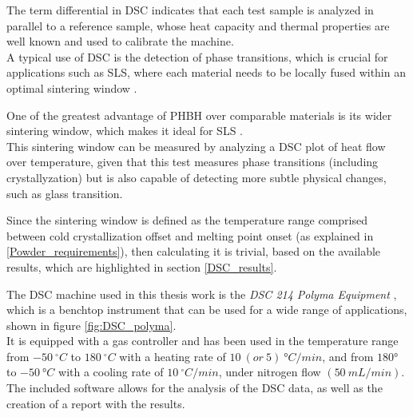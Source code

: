 \documentclass{article}
\begin{document}
            
            The term differential in DSC indicates that each test sample is analyzed in parallel to a reference sample, whose heat capacity and 
            thermal properties are well known and used to calibrate the machine. \\
            
            A typical use of DSC is the detection of phase transitions, which is crucial for applications such as SLS, where each material 
            needs to be locally fused within an optimal sintering window \autocites{Padovano_SLS_Review,SLS_3dprinting_biomedical_polymers}. 
    
            One of the greatest advantage of PHBH over comparable materials is its wider sintering window, which makes it ideal 
            for SLS \autocites{Kovalcik_PHA_Review,Eraslan_PHBH_review}. \\ 
    
            This sintering window can be measured by analyzing a DSC plot of heat flow over temperature, given that this test measures 
            phase transitions (including crystallyzation) but is also capable of detecting more subtle physical changes, such as glass transition. 
    
            Since the sintering window is defined as the temperature range comprised between cold crystallization offset and 
            melting point onset (as explained in \ref{Powder_requirements}), then calculating it is trivial, 
            based on the available results, which are highlighted in section \ref{DSC_results}.

                The DSC machine used in this thesis work is the \textit{DSC 214 Polyma Equipment} \autocites{Netzsch}, which is a benchtop instrument that can be used for 
                a wide range of applications, shown in figure \ref{fig:DSC_polyma}. \\ 

                It is equipped with a gas controller and has been used in the temperature range from $-50 \ ^{\circ} C$ 
                to $180 \ ^{\circ} C$ with 
                a heating rate of $10 \ (or \ 5) \ °C/min$, and from $180°$ to $-50 \ °C$ with a cooling rate of $10  \ ^{\circ}C/min$, 
                under nitrogen flow $(50 \ mL/min)$. \\ 

                The included software allows for the analysis of the 
                DSC data, as well as the creation of a report with the results. \\ 
\end{document}
